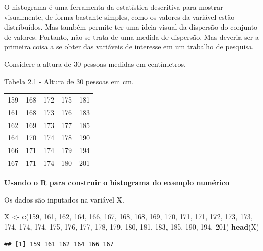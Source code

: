 \documentclass[
]{book}
\newenvironment{Shaded}{\begin{snugshade}}{\end{snugshade}}
\newcommand{\DecValTok}[1]{\textcolor[rgb]{0.00,0.00,0.81}{#1}}
\newcommand{\KeywordTok}[1]{\textcolor[rgb]{0.13,0.29,0.53}{\textbf{#1}}}
\newcommand{\NormalTok}[1]{#1}
\newcommand{\StringTok}[1]{\textcolor[rgb]{0.31,0.60,0.02}{#1}}
\begin{document}
O histograma é uma ferramenta da estatística descritiva para mostrar visualmente, de forma bastante simples, como os valores da variável estão distribuídos. Mas também permite ter uma ideia visual da dispersão do conjunto de valores. Portanto, não se trata de uma medida de dispersão. Mas deveria ser a primeira coisa a se obter das variáveis de interesse em um trabalho de pesquisa.

Considere a altura de 30 pessoas medidas em centímetros.

Tabela 2.1 - Altura de 30 pessoas em cm.

\begin{longtable}[]{@{}ccccc@{}}
\toprule
\endhead
159 & 168 & 172 & 175 & 181\tabularnewline
161 & 168 & 173 & 176 & 183\tabularnewline
162 & 169 & 173 & 177 & 185\tabularnewline
164 & 170 & 174 & 178 & 190\tabularnewline
166 & 171 & 174 & 179 & 194\tabularnewline
167 & 171 & 174 & 180 & 201\tabularnewline
\bottomrule
\end{longtable}

\textbf{Usando o R para construir o histograma do exemplo numérico}

Os dados são inputados na variável X.

\begin{Shaded}
\begin{Highlighting}[]
\NormalTok{X <-}\StringTok{ }\KeywordTok{c}\NormalTok{(}\DecValTok{159}\NormalTok{, }\DecValTok{161}\NormalTok{, }\DecValTok{162}\NormalTok{, }\DecValTok{164}\NormalTok{, }\DecValTok{166}\NormalTok{, }\DecValTok{167}\NormalTok{, }\DecValTok{168}\NormalTok{, }\DecValTok{168}\NormalTok{, }\DecValTok{169}\NormalTok{, }
    \DecValTok{170}\NormalTok{, }\DecValTok{171}\NormalTok{, }\DecValTok{171}\NormalTok{, }\DecValTok{172}\NormalTok{, }\DecValTok{173}\NormalTok{, }\DecValTok{173}\NormalTok{, }\DecValTok{174}\NormalTok{, }\DecValTok{174}\NormalTok{, }\DecValTok{174}\NormalTok{, }\DecValTok{175}\NormalTok{, }
    \DecValTok{176}\NormalTok{, }\DecValTok{177}\NormalTok{, }\DecValTok{178}\NormalTok{, }\DecValTok{179}\NormalTok{, }\DecValTok{180}\NormalTok{, }\DecValTok{181}\NormalTok{, }\DecValTok{183}\NormalTok{, }\DecValTok{185}\NormalTok{, }\DecValTok{190}\NormalTok{, }\DecValTok{194}\NormalTok{, }
    \DecValTok{201}\NormalTok{)}
\KeywordTok{head}\NormalTok{(X)}
\end{Highlighting}
\end{Shaded}

\begin{verbatim}
## [1] 159 161 162 164 166 167
\end{verbatim}
\end{document}
